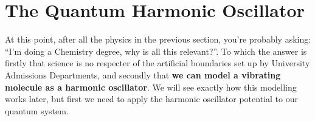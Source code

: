 \documentclass{memoir}[11pt,oneside,a4paper,openany]
\begin{document}
\section{The Quantum Harmonic Oscillator}
At this point, after all the physics in the previous section, you're probably asking: ``I'm doing a Chemistry degree, why is all this relevant?''. To which the answer is firstly that science is no respecter of the artificial boundaries set up by University Admissions Departments, and secondly that \textbf{we can model a vibrating molecule as a harmonic oscillator}. We will see exactly how this modelling works later, but first we need to apply the harmonic oscillator potential to our quantum system.


\end{document}
